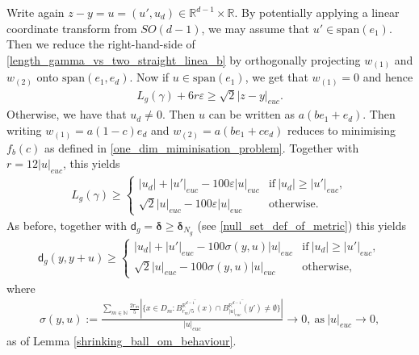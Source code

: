 \documentclass[a4paper,10pt]{article}
\numberwithin{equation}{section}
\newcommand{\R}{\mathbb{R}}
\newcommand{\N}{\mathbb{N}}
\newcommand{\e}{\varepsilon}
\newcommand{\sfd}{\mathsf d}
\begin{document}
Write again $z-y = u = (u', u_d) \in \R^{d-1} \times \R$. By potentially applying a linear coordinate transform from $SO(d-1)$, we may assume that $u' \in \mathrm{span}(e_1)$. Then we reduce the right-hand-side of \eqref{length_gamma_vs_two_straight_linea_b} by orthogonally projecting $w_{(1)}$ and $w_{(2)}$ onto $\mathrm{span}(e_1, e_d)$. 
Now if $u \in \mathrm{span}(e_1)$, we get that $w_{(1)} =0$ and hence
\begin{align*}
    L_g(\gamma) + 6r\e \geq \sqrt{2}|z-y|_{euc}.
\end{align*}
Otherwise, we have that $u_d \neq 0$. Then $u$ can be written as $a(be_1 + e_d)$. Then writing $w_{(1)} = a(1-c)e_d$ and $w_{(2)} = a(be_1 + ce_d)$ reduces to minimising $f_b(c)$ as defined in \eqref{one_dim_miminisation_problem}. Together with $r = 12|u|_{euc}$, this yields 
\begin{align*}
    L_g(\gamma) \geq \left\{ \begin{array}{ll}
           |u_d| + |u'|_{euc} - 100\e|u|_{euc} & \mathrm{if}\ |u_d| \geq |u'|_{euc}, \\
           \sqrt{2}|u|_{euc}- 100\e|u|_{euc}\  & \mathrm{otherwise}.
        \end{array}\right.
\end{align*}
As before, together with $\sfd_g = \boldsymbol{\delta} \geq \boldsymbol{\delta}_{N_g}$ (see \eqref{null_set_def_of_metric}) this yields  
\begin{align}\label{asymptotic_lower_bound_metric_ex2}
    \sfd_g(y, y+u) \geq \left\{ \begin{array}{ll}
           |u_d| + |u'|_{euc} - 100\sigma(y, u)|u|_{euc} & \mathrm{if}\ |u_d| \geq |u'|_{euc}, \\
           \sqrt{2}|u|_{euc}- 100\sigma(y, u)|u|_{euc}\  & \mathrm{otherwise},
        \end{array}\right.
\end{align}
where 
\begin{align*}
    \sigma(y,u) := \frac{\sum_{m \in \N}\frac{2r_m}{5}|\{x \in D_m: \overline{B^{\R^{d-1}}_{r_m/5}(x)} \cap \overline{B^{\R^{d-1}}_{|u|_{euc}}(y')}\neq \emptyset\}|}{|u|_{euc}} \to 0,\ \mathrm{as} \ |u|_{euc}  \to 0,
\end{align*}
as of Lemma \ref{shrinking_ball_om_behaviour}.
\end{document}
